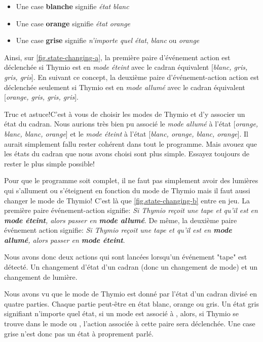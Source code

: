 \begin{itemize}
	\item Une case \textbf{blanche} signifie \textit{état blanc}
	\item Une case \textbf{orange} signifie \textit{état orange}
	\item Une case \textbf{grise} signifie \textit{n'importe quel état}, \textit{blanc} ou \textit{orange}
\end{itemize}

Ainsi, sur \cref{fig.state-changing-a}, la première paire d'événement action est déclenchée si Thymio est en \textit{mode éteint} avec le cadran équivalent [\textit{blanc, gris, gris, gris}]. En suivant ce concept, la deuxième paire d'événement-action action est déclenchée seulement si Thymio est en \textit{mode allumé} avec le cadran équivalent [\textit{orange, gris, gris, gris}]. 

\begin{bclogo}[couleur = blue!30, arrondi = 0.1, logo = \bcinfo, ombre = true]{Truc et astuce!}C'est à vous de choisir les modes de Thymio et d'y associer un état du cadran. Nous aurions très bien pu associé le \textit{mode allumé} à l'état  [\textit{orange, blanc, blanc, orange}] et le \textit{mode éteint} à l'état [\textit{blanc, orange, blanc, orange}]. Il aurait simplement fallu rester cohérent dans tout le programme. Mais avouez que les états du cadran que nous avons choisi sont plus simple. Essayez toujours de rester le plus simple possible!
\end{bclogo}

Pour que le programme soit complet, il ne faut pas simplement avoir des lumières qui s'allument ou s'éteignent en fonction du mode de Thymio mais il faut aussi changer le mode de Thymio! C'est là que \cref{fig.state-changing-b} entre en jeu. La première paire événement-action signifie: \textit{Si Thymio reçoit une tape et qu'il est en \textbf{mode éteint}, alors passer en \textbf{mode allumé}}. De même, la deuxième paire événement action signifie: \textit{Si Thymio reçoit une tape et qu'il est en \textbf{mode allumé}, alors passer en \textbf{mode éteint}}.

Nous avons donc deux actions qui sont lancées lorsqu'un événement "tape" est détecté. Un changement d'état d'un cadran (donc un changement de mode) et un changement de lumière.


Nous avons vu que le mode de Thymio est donné par l'état d'un cadran divisé en quatre parties. Chaque partie peut-être en état blanc, orange ou gris. Un état gris signifiant n'importe quel état, si un mode est associé à , alors, si Thymio se trouve dans le mode  ou , l'action associée à cette paire sera déclenchée. Une case grise n'est donc pas un état à proprement parlé.

